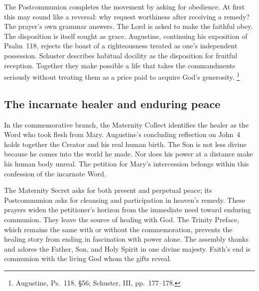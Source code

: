 The Postcommunion completes the movement by asking for obedience. At
first this may sound like a reversal: why request worthiness after
receiving a remedy? The prayer's own grammar answers. The Lord is asked
to make the faithful obey. The disposition is itself sought as grace.
Augustine, continuing his exposition of Psalm~118, rejects the boast
of a righteousness treated as one's independent possession. Schuster
describes habitual docility as the disposition for fruitful reception.
Together they make possible a life that takes the commandments seriously
without treating them as a price paid to acquire God's generosity.
\footnote{Augustine, Ps.~118, \S56; Schuster, III, pp.~177--178.}

\subsection{The incarnate healer and enduring peace}
In the commemorative branch, the Maternity Collect identifies the healer
as the Word who took flesh from Mary. Augustine's concluding reflection
on John~4 holds together the Creator and his real human birth. The Son
is not less divine because he comes into the world he made. Nor does
his power at a distance make his human body unreal. The petition for
Mary's intercession belongs within this confession of the incarnate Word.

The Maternity Secret asks for both present and perpetual peace; its
Postcommunion asks for cleansing and participation in heaven's remedy.
These prayers widen the petitioner's horizon from the immediate need
toward enduring communion. They leave the source of healing with God.
The Trinity Preface, which remains the same with or without the
commemoration, prevents the healing story from ending in fascination
with power alone. The assembly thanks and adores the Father, Son, and
Holy Spirit in one divine majesty. Faith's end is communion with the
living God whom the gifts reveal.

